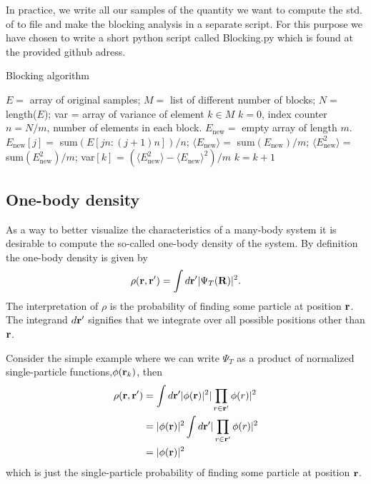 \documentclass[a4paper,10pt]{article}
\begin{document}
In practice, we write all our samples of the quantity we want to compute the std. of to file and make the blocking analysis in a separate script. For this purpose we
have chosen to write a short python script called Blocking.py which is found at the provided github adress. 

\begin{algorithm}[h!]
\caption{Blocking algorithm}\label{euclid}
\begin{algorithmic}[1]
\State $E=$ array of original samples;
\State $M=$ list of different number of blocks;
\State $N=$ length($E$);
\State var = array of variance of element $k \in M$
\State $k=0$, index counter
\State $n=N/m$, number of elements in each block.
\State $E_{\text{new}}=$ empty array of length $m$.
\State $E_{\text{new}}[j]=$ sum$(E[jn:(j+1)n])/n$;
\EndFor
\State$\langle E_{\text{new}} \rangle=$ sum$(E_{\text{new}})/m$;
\State$\langle E_{\text{new}}^2 \rangle=$ sum$(E_{\text{new}}^2)/m$;
\State var$[k]$ = $(\langle E_{\text{new}}^2 \rangle - \langle E_{\text{new}} \rangle^2)/m $
\State $k = k+1$
\EndFor
\EndProcedure
\end{algorithmic}
\end{algorithm}

\subsection{One-body density}
As a way to better visualize the characteristics of a many-body system it is desirable to compute the so-called one-body density of the system.
By definition the one-body density is given by
\begin{equation}
 \rho({\bf r}, {\bf r}') = \int d{\bf r}' |\Psi_T({\bf R})|^2.
\end{equation}
The interpretation of $\rho$ is the probability of finding some particle at position ${\bf r}$. The integrand $d{\bf r}'$ signifies that we integrate over all possible positions other
than ${\bf r}$. 

Consider the simple example where we can write $\Psi_T$ as a product of normalized single-particle functions,$\phi({\bf r}_k)$,  then
\begin{align*}
 \rho({\bf r}, {\bf r}') &= \int d{\bf r}' |\phi({\bf r})|^2 |\prod_ {r \in {\bf r}'} \phi(r)|^2 \\
			 &= |\phi({\bf r})|^2 \int d{\bf r}' |\prod_ {r \in {\bf r}'} \phi(r)|^2 \\
			 &= |\phi({\bf r})|^2
\end{align*}
which is just the single-particle probability of finding some particle at position ${\bf r}$. 
\end{document}
